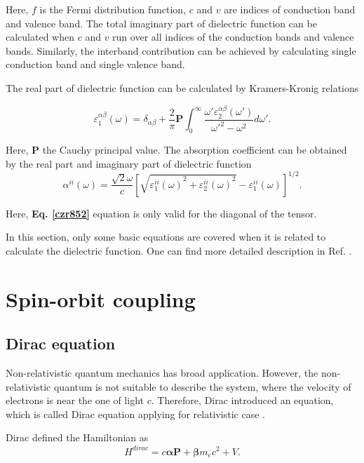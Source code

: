 \documentclass[a4paper, 12pt, titlepage,oneside,drop]{kthesis}
\begin{document}
Here, $f$ is the Fermi distribution function,  $c$ and $v$ are indices of conduction band and valence band. The total imaginary part of dielectric function can be calculated when $c$ and $v$ run over all indices of 
the conduction bands and valence bands. Similarly, the interband contribution can be achieved by calculating single conduction band and single valence band.   

The real part of dielectric function can be calculated by Kramers-Kronig relations

\begin{equation}
 \varepsilon_1^{\alpha\beta} (\omega)= \delta_{\alpha\beta}+\frac{2}{\pi}\textbf{P}\int^{\infty}_{0} \frac{\omega'\varepsilon_2^{\alpha\beta}(\omega')}{\omega'^{2}-\omega^{2}} d\omega'.
\end{equation}

Here, $\textbf{P}$ the Cauchy principal value. The absorption coefficient can be obtained by the real part and imaginary part of dielectric function
\begin{equation}\label{czr852}
 \alpha^{ii}(\omega) = \frac{\sqrt{2}\omega}{c} \left[ \sqrt{{\varepsilon^{ii}_1(\omega)}^2+{\varepsilon^{ii}_2(\omega)}^2}-{\varepsilon^{ii}_1(\omega)} \right]^{1/2}.
\end{equation}

Here, \textbf{Eq. \ref{czr852}} equation is only valid for the diagonal of the tensor.

In this section, only some basic equations are covered when it is related to calculate the dielectric function. One can find more detailed description in Ref. \cite{ambrosch2006linear}.

\section{Spin-orbit coupling}
\label{srasoc}

\subsection{Dirac equation}

Non-relativistic quantum mechanics has broad application. However, the non-relativistic quantum is not suitable to describe the system, where the velocity of electrons is near the one of light $c$. 
Therefore, Dirac introduced an equation, which is called Dirac equation applying for relativistic case \cite{thaller1992dirac, dirac1930principles}.

\noindent Dirac defined the Hamiltonian as
\begin{equation}\label{dirac}
{H}^{dirac} = c \boldsymbol{\alpha} \textbf{P} + \boldsymbol{\beta}m_ec^{2} + V.
\end{equation}
\end{document}
